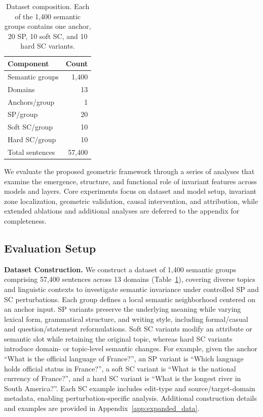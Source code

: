 
\begin{table}
\vspace{-1.0em}
\centering
\footnotesize
\setlength{\tabcolsep}{5pt}
\renewcommand{\arraystretch}{1.1}
\begin{tabular}{lr}
\toprule
\textbf{Component} & \textbf{Count} \\
\midrule
Semantic groups & 1,400 \\
Domains & 13 \\
\midrule
Anchors/group & 1 \\
SP/group & 20 \\
Soft SC/group & 10 \\
Hard SC/group & 10 \\
\midrule
Total sentences & 57,400 \\
\bottomrule
\end{tabular}
\caption{Dataset composition. Each of the 1,400 semantic groups contains one anchor, 20 SP, 10 soft SC, and 10 hard SC variants.}
\label{tab:dataset_category}
\vspace{-4.0em}
\end{table}

We evaluate the proposed geometric framework through a series of analyses that examine the emergence, structure, and functional role of invariant features across models and layers. Core experiments focus on dataset and model setup, invariant zone localization, geometric validation, causal intervention, and attribution, while extended ablations and additional analyses are deferred to the appendix for completeness. 

\subsection{Evaluation Setup}
\label{sec:eval_setup}

\textbf{Dataset Construction.}
We construct a dataset of 1,400 semantic groups comprising 57,400 sentences across 13 domains (Table~\ref{tab:dataset_category}), covering diverse topics and linguistic contexts to investigate semantic invariance under controlled SP and SC perturbations.
Each group defines a local semantic neighborhood centered on an anchor input. SP variants preserve the underlying meaning while varying lexical form, grammatical structure, and writing style, including formal/casual and question/statement reformulations. Soft SC variants modify an attribute or semantic slot while retaining the original topic, whereas hard SC variants introduce domain- or topic-level semantic changes. For example, given the anchor ``What is the official language of France?'', an SP variant is ``Which language holds official status in France?'', a soft SC variant is ``What is the national currency of France?'', and a hard SC variant is ``What is the longest river in South America?''. Each SC example includes edit-type and source/target-domain metadata, enabling perturbation-specific analysis. Additional construction details and examples are provided in Appendix~\ref{app:expanded_data}.

